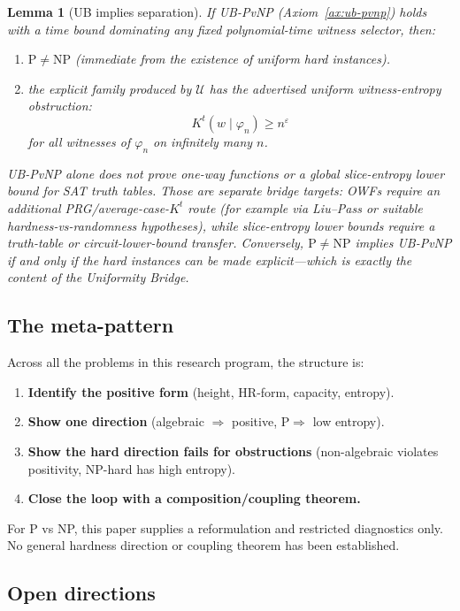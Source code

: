 \documentclass[aps,prd,twocolumn,superscriptaddress,nofootinbib]{revtex4-2}
\newtheorem{lemma}[theorem]{Lemma}
\theoremstyle{definition}
\theoremstyle{remark}
\newcommand{\NP}{\mathrm{NP}}
\newcommand{\PP}{\mathrm{P}}
\begin{document}
\begin{lemma}[UB implies separation]\label{lem:ub-separation}
If UB-PvNP (Axiom~\ref{ax:ub-pvnp}) holds with a time bound dominating any
fixed polynomial-time witness selector, then:
\begin{enumerate}
\item[(a)] $\PP \neq \NP$ (immediate from the existence of uniform hard instances).
\item[(b)] the explicit family produced by $\mathcal{U}$ has the advertised
uniform witness-entropy obstruction:
\[
  K^t(w\mid \varphi_n)\geq n^\varepsilon
\]
for all witnesses of $\varphi_n$ on infinitely many $n$.
\end{enumerate}
UB-PvNP alone does not prove one-way functions or a global slice-entropy
lower bound for SAT truth tables.  Those are separate bridge targets: OWFs
require an additional PRG/average-case-$K^t$ route (for example via
Liu--Pass or suitable hardness-vs-randomness hypotheses), while slice-entropy
lower bounds require a truth-table or circuit-lower-bound transfer.
Conversely, $\PP \neq \NP$ implies UB-PvNP if and only if the hard instances can be made \emph{explicit}---which is exactly the content of the Uniformity Bridge.
\end{lemma}

\subsection{The meta-pattern}

Across all the problems in this research program, the structure is:

\begin{enumerate}
\item \textbf{Identify the positive form} (height, HR-form, capacity, entropy).
\item \textbf{Show one direction} (algebraic $\Rightarrow$ positive, $\PP \Rightarrow$ low entropy).
\item \textbf{Show the hard direction fails for obstructions} (non-algebraic violates positivity, NP-hard has high entropy).
\item \textbf{Close the loop with a composition/coupling theorem.}
\end{enumerate}

For P vs NP, this paper supplies a reformulation and restricted diagnostics only. No general hardness direction or coupling theorem has been established.

\subsection{Open directions}
\end{document}
